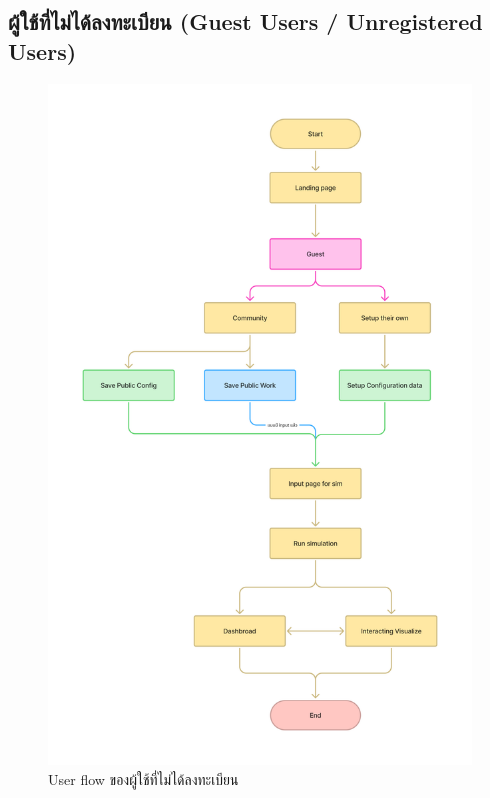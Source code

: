   \subsection{ผู้ใช้ที่ไม่ได้ลงทะเบียน (Guest Users / Unregistered Users)}
    \begin{figure}[H]
      \centering
      \includegraphics[width=\textwidth,height=0.6\textheight,keepaspectratio]{User_flow_-_guest.png}
      \caption{User flow  ของผู้ใช้ที่ไม่ได้ลงทะเบียน}
      \label{fig:UserFlowUnregistered}
    \end{figure}
    \newpage

